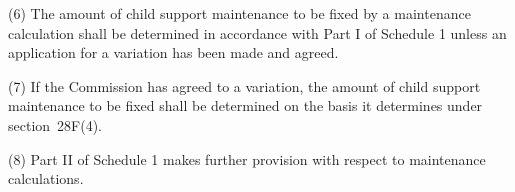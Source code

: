 \documentclass[12pt,a4paper]{article}
\begin{document}
%
%
%
%
%

(6) The amount of child support maintenance to be fixed by a maintenance calculation shall be determined in accordance with Part I of Schedule 1 unless an application for a variation has been made and agreed.

(7) If the 
Commission  %
has agreed to a variation, the amount of child support maintenance to be fixed shall be determined on the basis 
it  %
determines under section~28F(4).

(8) Part II of Schedule 1 makes further provision with respect to maintenance calculations.

\end{document}
